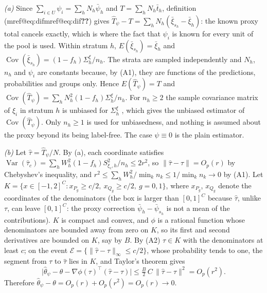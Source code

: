 \documentclass[pdflatex,sn-mathphys-num,iicol]{sn-jnl}
\makeatletter
\theoremstyle{thmstyleone}
\theoremstyle{thmstyletwo}
\theoremstyle{thmstylethree}
\newcommand{\Mref}[1]{\ifcsname mref@#1\endcsname\csname mref@#1\endcsname\else\textbf{??}\fi}
\makeatother
\begin{document}
\emph{(a)} Since $\sum_{i\in U}\psi_i=\sum_hN_h\bar\psi_h$ and $T=\sum_hN_h\bar t_h$, definition (\Mref{eq:dif}) gives
$\hat T_\psi-T=\sum_hN_h(\bar\xi_{s_h}-\bar\xi_h)$: the known proxy total cancels exactly, which is where the
fact that $\psi_i$ is known for every unit of the pool is used. Within stratum $h$,
$E(\bar\xi_{s_h})=\bar\xi_h$ and $\operatorname{Cov}(\bar\xi_{s_h})=(1-f_h)\Sigma^\xi_h/n_h$. The strata are sampled independently and
$N_h$, $n_h$ and $\psi_i$ are constants because, by (A1), they are functions of the predictions, probabilities
and groups only. Hence $E(\hat T_\psi)=T$ and
$\operatorname{Cov}(\hat T_\psi)=\sum_hN_h^2(1-f_h)\Sigma^\xi_h/n_h$. For $n_h\ge2$ the sample covariance matrix of
$\xi_i$ in stratum $h$ is unbiased for $\Sigma^\xi_h$ \citep[Ch.~2]{cochran1977}, which gives the unbiased estimator of
$\operatorname{Cov}(\hat T_\psi)$. Only $n_h\ge1$ is used for unbiasedness, and nothing is
assumed about the proxy beyond its being label-free. The case $\psi\equiv0$ is the plain estimator.

\emph{(b)} Let $\hat\tau=\hat T_\psi/N$. By (a), each coordinate satisfies
$\operatorname{Var}(\hat\tau_c)=\sum_hW_h^2(1-f_h)S^2_{\xi_c,h}/n_h\le2r^2$, so
$\|\hat\tau-\tau\|=O_p(r)$ by Chebyshev's inequality, and $r^2\le\sum_hW_h^2/\min_kn_k\le
1/\min_kn_k\to0$ by (A1). Let $K=\{x\in[-1,2]^C:x_{P_g}\ge c/2,\ x_{Q_g}\ge c/2,\ g=0,1\}$, where
$x_{P_g}$, $x_{Q_g}$ denote the coordinates of the denominators (the box is larger than $[0,1]^C$ because
$\hat\tau$, unlike $\tau$, can leave $[0,1]^C$: the proxy correction $\bar\psi_h-\bar\psi_{s_h}$ is not a mean of the contributions). $K$ is compact and convex, and
$\phi$ is a rational function whose denominators are bounded away from zero on $K$, so its first
and second derivatives are bounded on $K$, say by $B$. By (A2) $\tau\in K$ with the denominators at
least $c$; on the event $\mathcal E=\{\|\hat\tau-\tau\|_\infty\le c/2\}$, whose probability tends to
one, the segment from $\tau$ to $\hat\tau$ lies in $K$, and Taylor's theorem gives
\begin{equation}\label{eq:taylor}
\big|\hat\theta_\psi-\theta-\nabla\phi(\tau)^\top(\hat\tau-\tau)\big|\le\tfrac{B}{2}\,C\,\|\hat\tau-\tau\|^2=O_p(r^2).
\end{equation}
Therefore $\hat\theta_\psi-\theta=O_p(r)+O_p(r^2)=O_p(r)\to0$.
\end{document}

